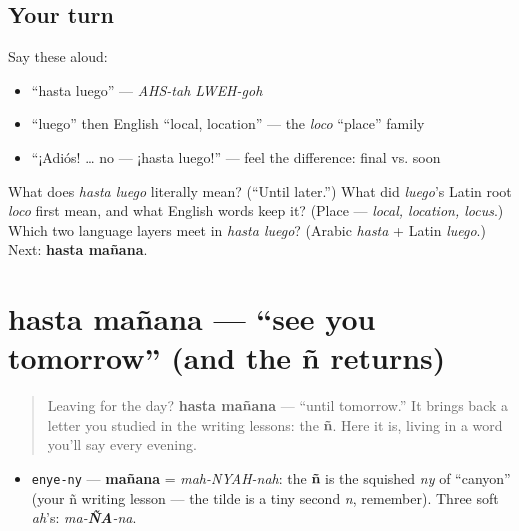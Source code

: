 \subsection*{Your turn}
Say these aloud:

\begin{itemize}
\raggedright
  \item \textquotedblleft{}hasta luego\textquotedblright{} — \emph{AHS-tah LWEH-goh}
  \item \textquotedblleft{}luego\textquotedblright{} then English \textquotedblleft{}local, location\textquotedblright{} — the \emph{loco} \textquotedblleft{}place\textquotedblright{} family
  \item \textquotedblleft{}¡Adiós! … no — ¡hasta luego!\textquotedblright{} — feel the difference: final vs. soon
\end{itemize}

\begin{tcolorbox}[breakable,colback=teal!4,colframe=teal!35!black,title={Before you move on}]
What does \emph{hasta luego} literally mean? (\textquotedblleft{}Until later.\textquotedblright{}) What did \emph{luego}'s Latin root \emph{loco} first mean, and what English words keep it? (Place — \emph{local, location, locus}.) Which two language layers meet in \emph{hasta luego}? (Arabic \emph{hasta} + Latin \emph{luego}.) Next: \textbf{hasta mañana}.
\end{tcolorbox}
\section[hasta mañana]{hasta mañana — \textquotedblleft{}see you tomorrow\textquotedblright{} (and the ñ returns)}

\label{lesson:ES-C05-hasta-manana}



\begin{quote}
Leaving for the day? \textbf{hasta mañana} — \textquotedblleft{}until tomorrow.\textquotedblright{} It brings back a letter you studied in the writing lessons: the \textbf{ñ}. Here it is, living in a word you'll say every evening.
\end{quote}

\begin{sounds}
\begin{itemize}
\raggedright
  \item \texttt{enye-ny} — \textbf{mañana} = \emph{mah-NYAH-nah}: the \textbf{ñ} is the squished \emph{ny} of \textquotedblleft{}canyon\textquotedblright{} (your ñ writing lesson — the tilde is a tiny second \emph{n}, remember). Three soft \emph{ah}'s: \emph{ma-\textbf{ÑA}-na}.
\end{itemize}
\end{sounds}

